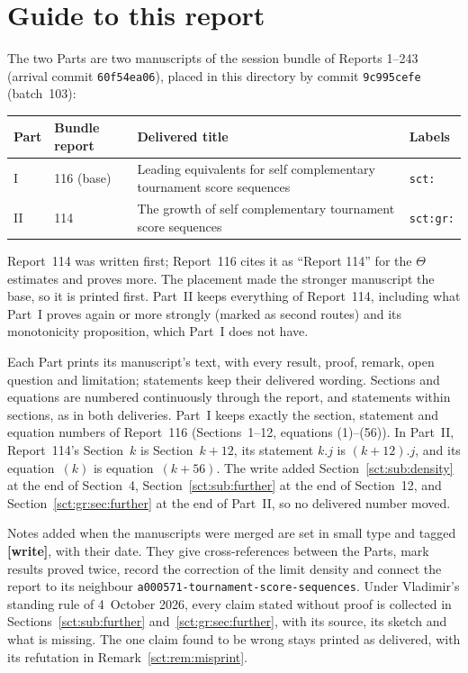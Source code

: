 \documentclass[11pt,letterpaper]{article}
\newcommand{\file}[1]{\nolinkurl{#1}}
\theoremstyle{definition}\newtheorem{remark}[theorem]{Remark}
\begin{document}
\section*{Guide to this report}\label{sct:sec:guide}
The two Parts are two manuscripts of the session bundle of Reports 1--243 (arrival commit \texttt{60f54ea06}), placed in this directory by commit \texttt{9c995cefe} (batch~103):
\begin{center}
\small
\begin{tabular}{@{}l l >{\raggedright\arraybackslash}p{} l@{}}
\toprule
Part & Bundle report & Delivered title & Labels\\
\midrule
I & 116 (base) & Leading equivalents for self complementary tournament score sequences & \texttt{sct:}\\
II & 114 & The growth of self complementary tournament score sequences & \texttt{sct:gr:}\\
\bottomrule
\end{tabular}
\end{center}
Report~114 was written first; Report~116 cites it as ``Report 114'' for the $\Theta$ estimates and proves more. The placement made the stronger manuscript the base, so it is printed first. Part~II keeps everything of Report~114, including what Part~I proves again or more strongly (marked as second routes) and its monotonicity proposition, which Part~I does not have.

Each Part prints its manuscript's text, with every result, proof, remark, open question and limitation; statements keep their delivered wording. Sections and equations are numbered continuously through the report, and statements within sections, as in both deliveries. Part~I keeps exactly the section, statement and equation numbers of Report~116 (Sections~1--12, equations (1)--(56)). In Part~II, Report~114's Section~$k$ is Section~$k+12$, its statement $k.j$ is $(k+12).j$, and its equation~$(k)$ is equation~$(k+56)$. The write added Section~\ref{sct:sub:density} at the end of Section~4, Section~\ref{sct:sub:further} at the end of Section~12, and Section~\ref{sct:gr:sec:further} at the end of Part~II, so no delivered number moved.

Notes added when the manuscripts were merged are set in small type and tagged \textbf{[write]}, with their date. They give cross-references between the Parts, mark results proved twice, record the correction of the limit density and connect the report to its neighbour \file{a000571-tournament-score-sequences}. Under Vladimir's standing rule of 4~October 2026, every claim stated without proof is collected in Sections~\ref{sct:sub:further} and~\ref{sct:gr:sec:further}, with its source, its sketch and what is missing. The one claim found to be wrong stays printed as delivered, with its refutation in Remark~\ref{sct:rem:misprint}.
\end{document}

